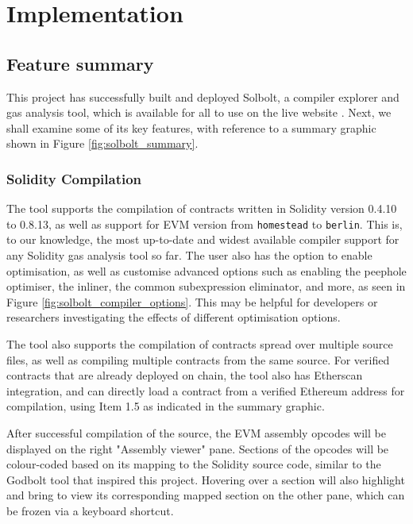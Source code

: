 \chapter{Implementation}
\label{chap:implementation}


\section{Feature summary}
This project has successfully built and deployed Solbolt, a compiler explorer and gas analysis tool,
which is available for all to use on the live website \cite{solbolt}. Next, we shall examine some of its
key features, with reference to a summary graphic shown in Figure \ref{fig:solbolt_summary}.

\subsection{Solidity Compilation}

The tool supports the compilation of contracts written in Solidity version 0.4.10 to 0.8.13,
as well as support for EVM version from \texttt{homestead} to \texttt{berlin}. This is, to
our knowledge, the most up-to-date and widest available compiler support for any 
Solidity gas analysis tool so far. The user also has the option to enable optimisation, as
well as customise advanced options such as enabling the peephole optimiser, the inliner,
the common subexpression eliminator, and more, as seen in Figure \ref{fig:solbolt_compiler_options}. This may be helpful for developers or
researchers investigating the effects of different optimisation options.

The tool also supports the compilation of contracts spread over multiple source files,
as well as compiling multiple contracts from the same source. For verified contracts that
are already deployed on chain, the tool also has Etherscan integration, and can directly
load a contract from a verified Ethereum address for compilation, using Item 1.5 
as indicated in the summary graphic.

After successful compilation of the source, the EVM assembly opcodes will be displayed
on the right "Assembly viewer" pane. Sections of the opcodes will be colour-coded based 
on its mapping to the Solidity source code, similar to the Godbolt tool that inspired this
project. Hovering over a section will also highlight and bring to view its corresponding
mapped section on the other pane, which can be frozen via a keyboard shortcut.


